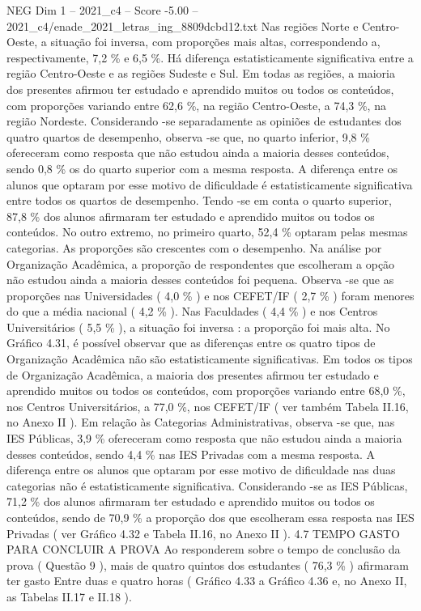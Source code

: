 \begin{textsample}{NEG Dim 1 – 2021\_c4 – Score -5.00 – 2021\_c4/enade\_2021\_letras\_ing\_8809dcbd12.txt}
Nas regiões Norte e Centro-Oeste, a situação foi inversa, com proporções mais altas, correspondendo a, respectivamente, 7,2 \% e 6,5 \%.
Há diferença estatisticamente significativa entre a região Centro-Oeste e as regiões Sudeste e Sul.
Em todas as regiões, a maioria dos presentes afirmou ter estudado e aprendido muitos ou todos os conteúdos, com proporções variando entre 62,6 \%, na região Centro-Oeste, a 74,3 \%, na região Nordeste.
Considerando -se separadamente as opiniões de estudantes dos quatro quartos de desempenho, observa -se que, no quarto inferior, 9,8 \% ofereceram como resposta que não estudou ainda a maioria desses conteúdos, sendo 0,8 \% os do quarto superior com a mesma resposta.
A diferença entre os alunos que optaram por esse motivo de dificuldade é estatisticamente significativa entre todos os quartos de desempenho.
Tendo -se em conta o quarto superior, 87,8 \% dos alunos afirmaram ter estudado e aprendido muitos ou todos os conteúdos.
No outro extremo, no primeiro quarto, 52,4 \% optaram pelas mesmas categorias.
As proporções são crescentes com o desempenho.
Na análise por Organização Acadêmica, a proporção de respondentes que escolheram a opção não estudou ainda a maioria desses conteúdos foi pequena.
Observa -se que as proporções nas Universidades ( 4,0 \% ) e nos CEFET/IF ( 2,7 \% ) foram menores do que a média nacional ( 4,2 \% ).
Nas Faculdades ( 4,4 \% ) e nos Centros Universitários ( 5,5 \% ), a situação foi inversa : a proporção foi mais alta.
No Gráfico 4.31, é possível observar que as diferenças entre os quatro tipos de Organização Acadêmica não são estatisticamente significativas.
Em todos os tipos de Organização Acadêmica, a maioria dos presentes afirmou ter estudado e aprendido muitos ou todos os conteúdos, com proporções variando entre 68,0 \%, nos Centros Universitários, a 77,0 \%, nos CEFET/IF ( ver também Tabela II.16, no Anexo II ).
Em relação às Categorias Administrativas, observa -se que, nas IES Públicas, 3,9 \% ofereceram como resposta que não estudou ainda a maioria desses conteúdos, sendo 4,4 \% nas IES Privadas com a mesma resposta.
A diferença entre os alunos que optaram por esse motivo de dificuldade nas duas categorias não é estatisticamente significativa.
Considerando -se as IES Públicas, 71,2 \% dos alunos afirmaram ter estudado e aprendido muitos ou todos os conteúdos, sendo de 70,9 \% a proporção dos que escolheram essa resposta nas IES Privadas ( ver Gráfico 4.32 e Tabela II.16, no Anexo II ). 4.7 TEMPO GASTO PARA CONCLUIR A PROVA Ao responderem sobre o tempo de conclusão da prova ( Questão 9 ), mais de quatro quintos dos estudantes ( 76,3 \% ) afirmaram ter gasto Entre duas e quatro horas ( Gráfico 4.33 a Gráfico 4.36 e, no Anexo II, as Tabelas II.17 e II.18 ).

\end{textsample}
